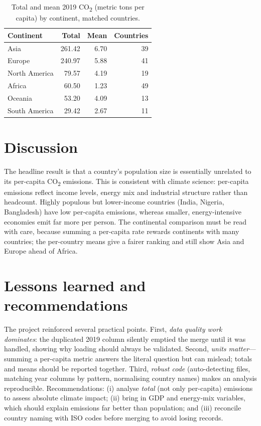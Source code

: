 \documentclass[11pt]{article}
\begin{document}
\begin{table}[h]
\centering
\caption{Total and mean 2019 CO\textsubscript{2} (metric tons per capita) by continent, matched countries.}
\label{tab:cont}
\small
\begin{tabular}{lrrr}
\toprule
Continent & Total & Mean & Countries \\
\midrule
Asia          & 261.42 & 6.70 & 39 \\
Europe        & 240.97 & 5.88 & 41 \\
North America & 79.57  & 4.19 & 19 \\
Africa        & 60.50  & 1.23 & 49 \\
Oceania       & 53.20  & 4.09 & 13 \\
South America & 29.42  & 2.67 & 11 \\
\bottomrule
\end{tabular}
\end{table}

\section{Discussion}
The headline result is that a country's population size is essentially unrelated
to its per-capita CO\textsubscript{2} emissions. This is consistent with climate
science: per-capita emissions reflect income levels, energy mix and industrial
structure rather than headcount. Highly populous but lower-income countries
(India, Nigeria, Bangladesh) have low per-capita emissions, whereas smaller,
energy-intensive economies emit far more per person. The continental comparison
must be read with care, because summing a per-capita rate rewards continents with
many countries; the per-country means give a fairer ranking and still show Asia
and Europe ahead of Africa.

\section{Lessons learned and recommendations}
The project reinforced several practical points. First, \emph{data quality work
dominates}: the duplicated 2019 column silently emptied the merge until it was
handled, showing why loading should always be validated. Second, \emph{units
matter}---summing a per-capita metric answers the literal question but can
mislead; totals and means should be reported together. Third, \emph{robust code}
(auto-detecting files, matching year columns by pattern, normalising country
names) makes an analysis reproducible. Recommendations: (i) analyse
\emph{total} (not only per-capita) emissions to assess absolute climate impact;
(ii) bring in GDP and energy-mix variables, which should explain emissions far
better than population; and (iii) reconcile country naming with ISO codes before
merging to avoid losing records.
\end{document}

